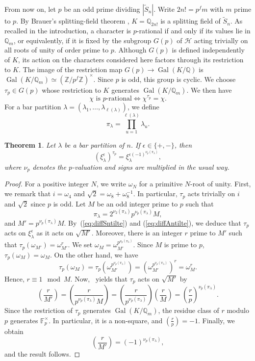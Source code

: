\documentclass[reqno]{amsart}
\DeclareMathOperator{\Gal}{Gal}
\newcommand{\tSym}{\widetilde{S}}
\newcommand{\legendre}[2]{\left(\frac{#1}{#2}\right)}
\newcommand{\Z}{\mathbb{Z}}
\newtheorem{theorem}{Theorem}[section] %
\theoremstyle{definition}
\begin{document}
From now on, let $p$ be an odd prime dividing $|\tSym_n|$. Write $2n!=p^f
m$ with $m$ prime to $p$. By Brauer's splitting-field theorem
\cite[Theorem 10.3]{isaacs}, $K=\mathbb Q_{2n!}$ is a splitting field of
$\tSym_n$. As  recalled in the introduction, a character is $p$-rational
if and only if its values lie in $\mathbb Q_m$, or equivalently, if it is
fixed by the subgroup $G(p)$ of $\mathcal H$ acting trivially on all roots
of unity of order prime to $p$. 
Although $G(p)$ is defined independently of $K$, its action on the
characters considered here factors through its restriction to $K$. The
image of the restriction map $G(p)\longrightarrow \Gal(K/\mathbb Q)$ is
$\Gal(K/\mathbb
Q_m)\simeq(\Z/p^{f}\Z)^\times$. Since $p$ is odd, this group is cyclic.
We choose $\tau_p\in G(p)$ whose restriction to $K$ generates $\Gal(K/\mathbb
Q_m)$. 
We then have 
$$
\chi\text{ is \(p\)-rational}
\iff
\chi^{\tau_p}=\chi.
$$
For a bar partition $\lambda=(\lambda_1,\ldots,\lambda_{\ell(\lambda)})$,
we define
\begin{equation}
\label{eq:prodpart}
\pi_{\lambda}=\prod_{u=1}^{\ell(\lambda)} \lambda_u.
\end{equation}

\begin{theorem}
Let $\lambda$ be a bar partition of $n$. If $\epsilon\in\{+,-\}$, then
$$(\xi_\lambda^\epsilon)^{\tau_p}=\xi_\lambda^{\epsilon(-1)^{\nu_p(\pi_{\lambda})}},$$
where $\nu_p$ denotes the $p$-valuation and signs are multiplied in the
usual way.
\end{theorem}

\begin{proof}
For a positive integer $N$, we write $\omega_N$ for a primitive $N$-root
of unity. First, we remark that $i=\omega_4$ and $\sqrt
2=\omega_8+\omega_8^{-1}$. In particular, $\tau_p$ acts trivially on $i$
and $\sqrt 2$ since $p$ is odd.
Let $M$ be an odd integer prime to $p$ such that
$$\pi_{\lambda}=2^{\nu_2(\pi_{\lambda})}p^{\nu_p(\pi_{\lambda})}M,$$
and $M'=p^{\nu_p(\pi_{\lambda})}M$. By~(\ref{eq:diffSntilte}) and
(\ref{eq:diffAntilte}), we deduce that $\tau_p$ acts on
$\xi_\lambda^\epsilon$ as it acts on $\sqrt{M'}$.
Moreover, there is an integer $r$  prime to $M'$ such that
$\tau_p(\omega_{M'})=\omega_{M'}^r$. We set
$\omega_M=\omega_{M'}^{p^{\nu_p(\pi_\lambda)}}$. Since $M$ is prime to
$p$, $\tau_p(\omega_M)=\omega_M$. On the other hand, we have
$$\tau_p(\omega_M)=\tau_p\left(\omega_{M'}^{p^{\nu_p(\pi_\lambda)}}\right)=
\left(\omega_{M'}^{p^{\nu_p(\pi_\lambda)}}\right)^r=\omega_M^r.$$
Hence, $r\equiv 1\mod M$. Now,~\cite[Proposition 4.1]{BrNa} yields that
$\tau_p$ acts on $\sqrt{M'}$ by
$$\legendre{r}{M'}=\legendre{r}{p^{\nu_p(\pi_\lambda)}M}=
\legendre{r}{p^{\nu_p(\pi_\lambda)}}\legendre{r}{M}=
\legendre{r}{p}^{\nu_p(\pi_\lambda)}.$$
Since the restriction of $\tau_p$ generates
$\Gal(K/\mathbb Q_m)$, the residue class of $r$ modulo $p$
generates $\mathbb F_p^\times$. In particular, it is a non-square, and
$\legendre{r}{p}=-1$. 
Finally, we obtain
$$\legendre{r}{M'}=(-1)^{\nu_p(\pi_\lambda)},$$
and the result follows.
\end{proof}
\end{document}
